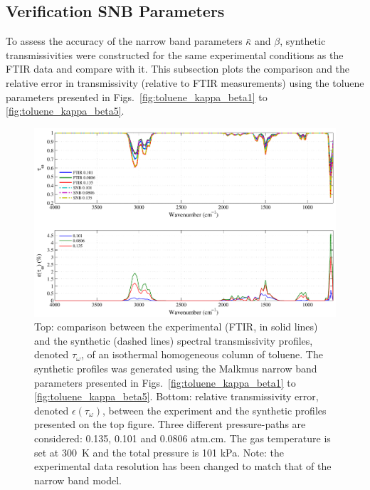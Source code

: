 \subsection{Verification SNB Parameters}

To assess the accuracy of the narrow band parameters $\bar{\kappa}$ and $\beta$, synthetic transmissivities were constructed for the same experimental conditions as the FTIR data and compare with it. This subsection plots the comparison and the relative error in transmissivity (relative to FTIR measurements) using the toluene parameters presented in Figs.~\ref{fig:toluene_kappa_beta1} to \ref{fig:toluene_kappa_beta5}.

\begin{figure}[!h]
\includegraphics[width=\textwidth]{Figures/Comparison_Fit_Toluene_MALKMUS_Temp300K.pdf}
\caption{Top: comparison between the experimental (FTIR, in solid lines) and the synthetic (dashed lines) spectral transmissivity profiles, denoted $\tau_{\omega}$, of an isothermal homogeneous column of toluene. The synthetic profiles was generated using the Malkmus narrow band parameters presented in Figs.~\ref{fig:toluene_kappa_beta1} to \ref{fig:toluene_kappa_beta5}. Bottom: relative transmissivity error, denoted $\epsilon{(\tau_{\omega})}$, between the experiment and the synthetic profiles presented on the top figure. Three different pressure-paths are considered: 0.135, 0.101 and 0.0806 atm.cm. The gas temperature is set at 300~K and the total pressure is 101 kPa. Note: the experimental data resolution has been changed to match that of the narrow band model. \label{fig:toluene_SNBVerify_300K}}
\end{figure}

